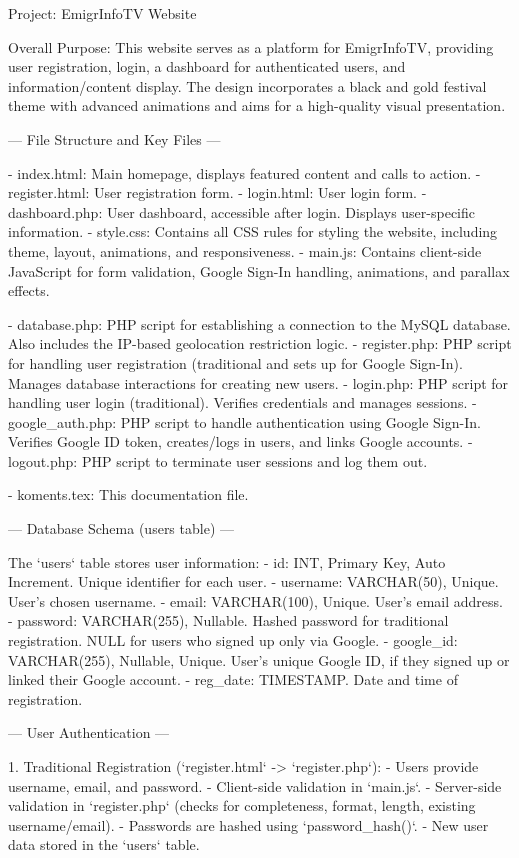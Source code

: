 Project: EmigrInfoTV Website

Overall Purpose:
This website serves as a platform for EmigrInfoTV, providing user registration, login, a dashboard for authenticated users, and information/content display. The design incorporates a black and gold festival theme with advanced animations and aims for a high-quality visual presentation.

--- File Structure and Key Files ---

- index.html: Main homepage, displays featured content and calls to action.
- register.html: User registration form.
- login.html: User login form.
- dashboard.php: User dashboard, accessible after login. Displays user-specific information.
- style.css: Contains all CSS rules for styling the website, including theme, layout, animations, and responsiveness.
- main.js: Contains client-side JavaScript for form validation, Google Sign-In handling, animations, and parallax effects.

- database.php: PHP script for establishing a connection to the MySQL database. Also includes the IP-based geolocation restriction logic.
- register.php: PHP script for handling user registration (traditional and sets up for Google Sign-In). Manages database interactions for creating new users.
- login.php: PHP script for handling user login (traditional). Verifies credentials and manages sessions.
- google_auth.php: PHP script to handle authentication using Google Sign-In. Verifies Google ID token, creates/logs in users, and links Google accounts.
- logout.php: PHP script to terminate user sessions and log them out.

- koments.tex: This documentation file.

--- Database Schema (users table) ---

The `users` table stores user information:
- id: INT, Primary Key, Auto Increment. Unique identifier for each user.
- username: VARCHAR(50), Unique. User's chosen username.
- email: VARCHAR(100), Unique. User's email address.
- password: VARCHAR(255), Nullable. Hashed password for traditional registration. NULL for users who signed up only via Google.
- google_id: VARCHAR(255), Nullable, Unique. User's unique Google ID, if they signed up or linked their Google account.
- reg_date: TIMESTAMP. Date and time of registration.

--- User Authentication ---

1. Traditional Registration (`register.html` -> `register.php`):
   - Users provide username, email, and password.
   - Client-side validation in `main.js`.
   - Server-side validation in `register.php` (checks for completeness, format, length, existing username/email).
   - Passwords are hashed using `password_hash()`.
   - New user data stored in the `users` table.

